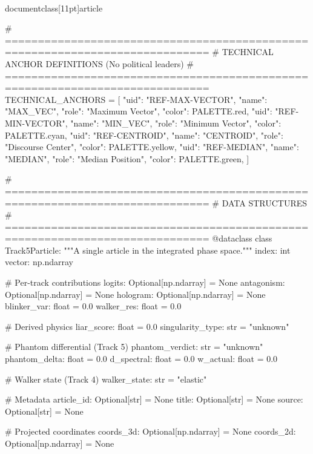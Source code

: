 \\documentclass[11pt]{article}
\begin{document}
\begin{CodeBlock}
# =============================================================================
# TECHNICAL ANCHOR DEFINITIONS (No political leaders)
# =============================================================================
TECHNICAL_ANCHORS = [
    {"uid": "REF-MAX-VECTOR", "name": "MAX_VEC", "role": "Maximum Vector", "color": PALETTE.red},
    {"uid": "REF-MIN-VECTOR", "name": "MIN_VEC", "role": "Minimum Vector", "color": PALETTE.cyan},
    {"uid": "REF-CENTROID", "name": "CENTROID", "role": "Discourse Center", "color": PALETTE.yellow},
    {"uid": "REF-MEDIAN", "name": "MEDIAN", "role": "Median Position", "color": PALETTE.green},
]


# =============================================================================
# DATA STRUCTURES
# =============================================================================
@dataclass
class Track5Particle:
    """A single article in the integrated phase space."""
    index: int
    vector: np.ndarray

    # Per-track contributions
    logits: Optional[np.ndarray] = None
    antagonism: Optional[np.ndarray] = None
    hologram: Optional[np.ndarray] = None
    blinker_var: float = 0.0
    walker_res: float = 0.0

    # Derived physics
    liar_score: float = 0.0
    singularity_type: str = "unknown"

    # Phantom differential (Track 5)
    phantom_verdict: str = "unknown"
    phantom_delta: float = 0.0
    d_spectral: float = 0.0
    w_actual: float = 0.0

    # Walker state (Track 4)
    walker_state: str = "elastic"

    # Metadata
    article_id: Optional[str] = None
    title: Optional[str] = None
    source: Optional[str] = None

    # Projected coordinates
    coords_3d: Optional[np.ndarray] = None
    coords_2d: Optional[np.ndarray] = None



\end{CodeBlock}
\end{document}
